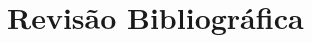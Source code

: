 {
\color{orange}

\section{
    Revisão Bibliográfica
} \label{sec:revisao_bibliografica}

\lipsum[1-3]

}
